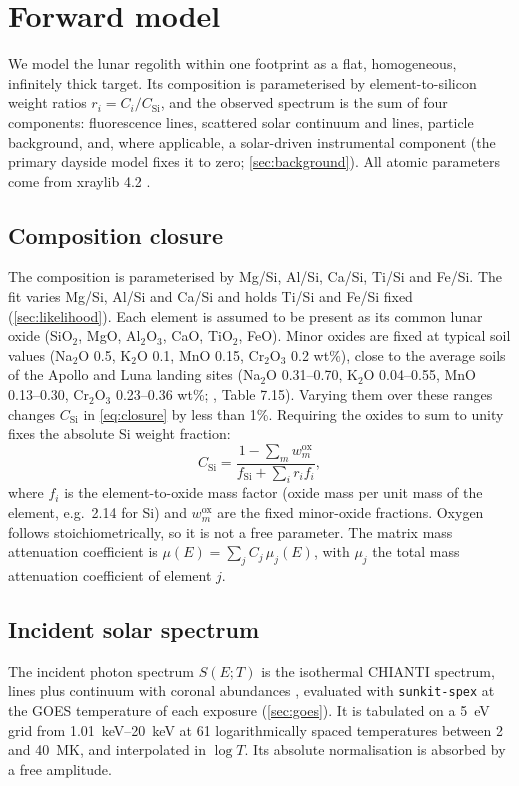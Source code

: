 \section{Forward model}\label{sec:model}

We model the lunar regolith within one footprint as a flat, homogeneous, infinitely thick target. Its composition is parameterised by element-to-silicon weight ratios $r_i = C_i/C_\mathrm{Si}$, and the observed spectrum is the sum of four components: fluorescence lines, scattered solar continuum and lines, particle background, and, where applicable, a solar-driven instrumental component (the primary dayside model fixes it to zero; \cref{sec:background}). All atomic parameters come from xraylib 4.2 \citep{Schoonjans2011}.

\subsection{Composition closure}\label{sec:closure}
The composition is parameterised by Mg/Si, Al/Si, Ca/Si, Ti/Si and Fe/Si. The fit varies Mg/Si, Al/Si and Ca/Si and holds Ti/Si and Fe/Si fixed (\cref{sec:likelihood}). Each element is assumed to be present as its common lunar oxide (SiO$_2$, MgO, Al$_2$O$_3$, CaO, TiO$_2$, FeO). Minor oxides are fixed at typical soil values (Na$_2$O 0.5, K$_2$O 0.1, MnO 0.15, Cr$_2$O$_3$ 0.2 wt\%), close to the average soils of the Apollo and Luna landing sites (Na$_2$O 0.31--0.70, K$_2$O 0.04--0.55, MnO 0.13--0.30, Cr$_2$O$_3$ 0.23--0.36 wt\%; \citealp{Heiken1991}, Table 7.15). Varying them over these ranges changes $C_\mathrm{Si}$ in \cref{eq:closure} by less than 1\%. Requiring the oxides to sum to unity fixes the absolute Si weight fraction:
\begin{equation}
C_\mathrm{Si} = \frac{1 - \sum_m w_m^\mathrm{ox}}{f_\mathrm{Si} + \sum_i r_i f_i},
\label{eq:closure}
\end{equation}
where $f_i$ is the element-to-oxide mass factor (oxide mass per unit mass of the element, e.g.\ 2.14 for Si) and $w_m^\mathrm{ox}$ are the fixed minor-oxide fractions. Oxygen follows stoichiometrically, so it is not a free parameter. The matrix mass attenuation coefficient is $\mu(E)=\sum_j C_j\,\mu_j(E)$, with $\mu_j$ the total mass attenuation coefficient of element $j$.

\subsection{Incident solar spectrum}\label{sec:solar}
The incident photon spectrum $S(E;T)$ is the isothermal CHIANTI spectrum, lines plus continuum with coronal abundances \citep{Dere1997}, evaluated with \texttt{sunkit-spex} at the GOES temperature of each exposure (\cref{sec:goes}). It is tabulated on a \SI{5}{eV} grid from \SIrange{1.01}{20}{keV} at 61 logarithmically spaced temperatures between 2 and \SI{40}{MK}, and interpolated in $\log T$. Its absolute normalisation is absorbed by a free amplitude.

